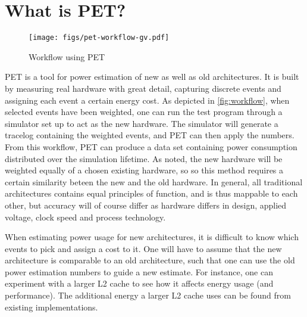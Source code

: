 \section{What is PET?}
\label{sec:whatispet}
\begin{figure}
    \texttt{[image: figs/pet-workflow-gv.pdf]}
    \caption{Workflow using PET}
    \label{fig:workflow}
\end{figure}

PET is a tool for power estimation of new as well as old architectures. It is
built by measuring real hardware with great detail, capturing discrete events
and assigning each event a certain energy cost. As depicted in
\autoref{fig:workflow}, when selected events have been weighted, one can run the
test program through a simulator set up to act as the new hardware. The
simulator will generate a tracelog containing the weighted events, and PET can
then apply the numbers. From this workflow, PET can produce a data set
containing power consumption distributed over the simulation lifetime. As noted,
the new hardware will be weighted equally of a chosen existing hardware, so so
this method requires a certain similarity beteen the new and the old hardware.
In general, all traditional architectures contains equal principles of function,
and is thus mappable to each other, but accuracy will of course differ as
hardware differs in design, applied voltage, clock speed and process technology.

When estimating power usage for new architectures, it is difficult to know which
events to pick and assign a cost to it. One will have to assume that the new
architecture is comparable to an old architecture, such that one can use the old
power estimation numbers to guide a new estimate. For instance, one can
experiment with a larger L2 cache to see how it affects energy usage (and
performance). The additional energy a larger L2 cache uses can be found from
existing implementations.
